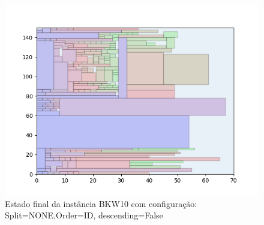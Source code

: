 \begin{figure}[H]
    \centering
    \caption[]{Estado final da instância BKW10 com configuração: Split=NONE,Order=ID, descending=False}
    \label{fig:bkw10-none-id-false}
    \includegraphics[scale=0.5]{output/figures/bkw/bkw10/none/id/false/000}
\end{figure}